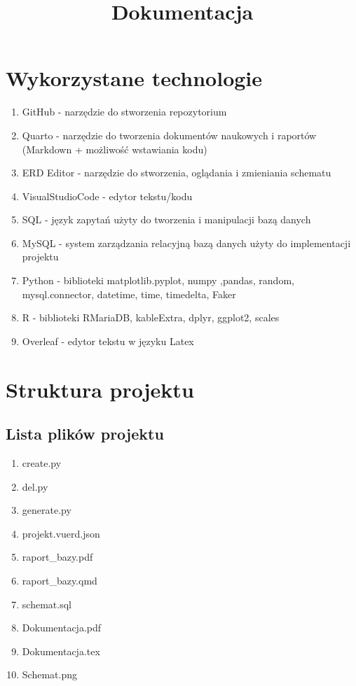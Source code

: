 \documentclass{article}
\title{\textbf{\huge Dokumentacja}}
\begin{document}
\tableofcontents

\maketitle

\section{Wykorzystane technologie}
\begin{enumerate}
    \item GitHub - narzędzie do stworzenia repozytorium
    \item Quarto - narzędzie do tworzenia dokumentów naukowych i raportów (Markdown + możliwość wstawiania kodu)
    \item ERD Editor - narzędzie do stworzenia, oglądania i zmieniania schematu
    \item VisualStudioCode - edytor tekstu/kodu
    \item SQL - język zapytań użyty do tworzenia i manipulacji bazą danych
    \item MySQL - system zarządzania relacyjną bazą danych użyty do implementacji projektu
    \item Python - biblioteki {matplotlib.pyplot, numpy ,pandas, random, mysql.connector, datetime, time, timedelta, Faker}
    \item R - biblioteki {RMariaDB, kableExtra, dplyr, ggplot2, scales}
    \item Overleaf - edytor tekstu w języku Latex
\end{enumerate}

\clearpage 

\section{Struktura projektu}
\subsection{Lista plików projektu}
\begin{enumerate}
    \item create.py
    \item del.py
    \item generate.py
    \item projekt.vuerd.json
    \item raport\_bazy.pdf
    \item raport\_bazy.qmd
    \item schemat.sql
    \item Dokumentacja.pdf
    \item Dokumentacja.tex
    \item Schemat.png
\end{enumerate}
\end{document}
